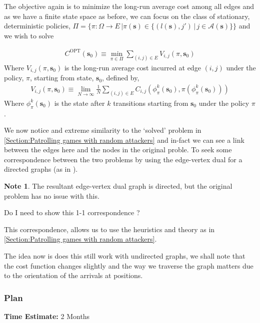 \documentclass[a4paper,10pt]{article}
\theoremstyle{definition}
\theoremstyle{definition}
\theoremstyle{remark}
\theoremstyle{definition}
\newtheorem*{note}{Note}
\begin{document}
The objective again is to minimize the long-run average cost among all edges and as we have a finite state space as before, we can focus on the class of stationary, deterministic policies, $\Pi = \{ \pi: \Omega \rightarrow E \, | \pi(\bm{s}) \in  \{(l(\bm{s}),j') \, | \, j \in \mathcal{A}(\bm{s}) \} \}$ and we wish to solve

\begin{align*}
C^{\text{OPT}}(\bm{s}_{0}) \equiv \min\limits_{\pi \in \Pi} \sum\limits_{(i,j) \in E} V_{i,j}(\pi,\bm{s}_{0})
\end{align*}
Where $V_{i,j}(\pi,\bm{s}_{0})$ is the long-run average cost incurred at edge $(i,j)$ under the policy, $\pi$, starting from state, $\bm{s}_{0}$, defined by,
\begin{align*}
V_{i,j}(\pi,\bm{s}_{0}) \equiv \lim\limits_{N \rightarrow \infty} \frac{1}{N} \sum\limits_{(i,j) \in E} C_{i,j}(\phi^{k}_{\pi}(\bm{s}_{0}),\pi(\phi^{k}_{\pi}(\bm{s}_{0})))
\end{align*}
Where $\phi^{k}_{\pi}(\bm{s}_{0})$ is the state after $k$ transitions starting from $\bm{s}_{0}$ under the policy $\pi$.


We now notice and extreme similarity to the `solved' problem in \ref{Section:Patrolling games with random attackers} and in-fact we can see a link between the edges here and the nodes in the original proble. To seek some correspondence between the two problems by using the edge-vertex dual for a directed graphs (as in ).

\begin{note}
The resultant edge-vertex dual graph is directed, but the original problem has no issue with this.
\end{note}

\begin{Huge}
Do I need to show this 1-1 correspondence ?
\end{Huge}

This correspondence, allows us to use the heuristics and theory as in \ref{Section:Patrolling games with random attackers}.

The idea now is does this still work with undirected graphs, we shall note that the cost function changes slightly and the way we traverse the graph matters due to the orientation of the arrivals at positions.

\subsubsection{Plan}
\textbf{Time Estimate:} 2 Months
\end{document}
